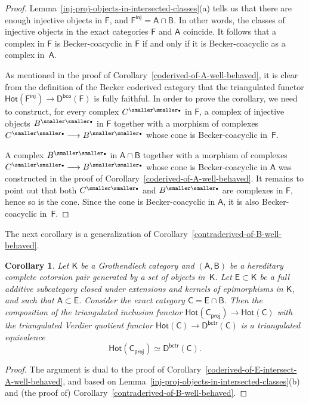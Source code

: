\documentclass[12pt,a4paper]{amsart}
\newcommand{\+}{\nobreakdash-}
\renewcommand{\:}{\colon}
\newcommand{\rarrow}{\longrightarrow}
\newcommand{\bu}{{\text{\smaller\smaller$\scriptstyle\bullet$}}}
\newcommand{\sA}{\mathsf A}
\newcommand{\sB}{\mathsf B}
\newcommand{\sC}{\mathsf C}
\newcommand{\sD}{\mathsf D}
\newcommand{\sE}{\mathsf E}
\newcommand{\sF}{\mathsf F}
\newcommand{\sK}{\mathsf K}
\newcommand{\Hot}{\mathsf{Hot}}
\newcommand{\proj}{\mathsf{proj}}
\newcommand{\inj}{\mathsf{inj}}
\newcommand{\bco}{\mathsf{bco}}
\newcommand{\bctr}{\mathsf{bctr}}
\theoremstyle{plain}
\newtheorem{cor}[thm]{Corollary}
\theoremstyle{definition}
\begin{document}
\begin{proof}
 Lemma~\ref{inj-proj-objects-in-intersected-classes}(a) tells us that
there are enough injective objects in $\sF$, and $\sF^\inj=\sA\cap\sB$.
 In other words, the classes of injective objects in the exact
categories $\sF$ and $\sA$ coincide.
 It follows that a complex in $\sF$ is Becker-coacyclic in $\sF$ if
and only if it is Becker-coacyclic as a complex in~$\sA$.

 As mentioned in the proof of
Corollary~\ref{coderived-of-A-well-behaved}, it is clear from
the definition of the Becker coderived category that the triangulated
functor $\Hot(\sF^\inj)\rarrow\sD^\bco(\sF)$ is fully faithful.
 In order to prove the corollary, we need to construct, for every
complex $C^\bu$ in $\sF$, a complex of injective objects $B^\bu$
in $\sF$ together with a morphism of complexes $C^\bu\rarrow B^\bu$
whose cone is Becker-coacyclic in~$\sF$.

 A complex $B^\bu$ in $\sA\cap\sB$ together with a morphism of
complexes $C^\bu\rarrow B^\bu$ whose cone is Becker-coacyclic
in $\sA$ was constructed in the proof of
Corollary~\ref{coderived-of-A-well-behaved}.
 It remains to point out that both $C^\bu$ and $B^\bu$ are complexes
in $\sF$, hence so is the cone.
 Since the cone is Becker-coacyclic in $\sA$, it is also
Becker-coacyclic in~$\sF$.
\end{proof}

 The next corollary is a generalization
of Corollary~\ref{contraderived-of-B-well-behaved}.

\begin{cor} \label{contraderived-of-E-intersect-B-well-behaved}
 Let\/ $\sK$ be a Grothendieck category and $(\sA,\sB)$ be a hereditary
complete cotorsion pair generated by a set of objects in\/~$\sK$.
 Let\/ $\sE\subset\sK$ be a full additive subcategory closed under
extensions and kernels of epimorphisms in\/ $\sK$, and such that\/
$\sA\subset\sE$.
 Consider the exact category\/ $\sC=\sE\cap\sB$.
 Then the composition of the triangulated inclusion functor\/
$\Hot(\sC_\proj)\rarrow\Hot(\sC)$ with the triangulated Verdier
quotient functor\/ $\Hot(\sC)\rarrow\sD^\bctr(\sC)$ is a triangulated
equivalence
$$
 \Hot(\sC_\proj)\simeq\sD^\bctr(\sC).
$$
\end{cor}

\begin{proof}
 The argument is dual to the proof of
Corollary~\ref{coderived-of-E-intersect-A-well-behaved}, and based on
Lemma~\ref{inj-proj-objects-in-intersected-classes}(b) and
(the proof of) Corollary~\ref{contraderived-of-B-well-behaved}.
\end{proof}
\end{document}
